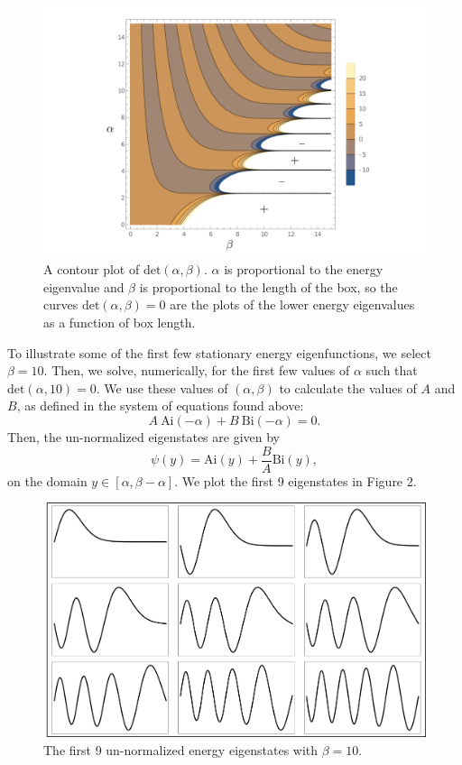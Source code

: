 \documentclass[12pt]{article}
\begin{document}
\begin{figure}[ht]
	\centering
	\includegraphics[width=\textwidth]{figures/plot1.png}
	\caption{A contour plot of $\text{det}(\alpha,\beta)$.  $\alpha$ is proportional to the energy eigenvalue and $\beta$ is proportional to the length of the box, so the curves $\text{det}(\alpha,\beta) = 0$ are the plots of the lower energy eigenvalues as a function of box length.}
\end{figure}

To illustrate some of the first few stationary energy eigenfunctions, we select $\beta = 10$.  Then, we solve, numerically, for the first few values of $\alpha$ such that $\text{det}(\alpha, 10) = 0.$  We use these values of $(\alpha,\beta)$ to calculate the values of $A$ and $B$, as defined in the system of equations found above:
\[
	A \ \text{Ai}(-\alpha) + B \ \text{Bi}(-\alpha) = 0.
\]
Then, the un-normalized eigenstates are given by
\[
	\psi(y) = \text{Ai}(y) + \frac{B}{A}\text{Bi}(y),
\] 
on the domain $y \in [\alpha, \beta - \alpha]$.  We plot the first 9 eigenstates in Figure 2.

\begin{figure}[ht]
	\centering
	\includegraphics[width=\textwidth]{figures/plot2.png}
	\caption{The first 9 un-normalized energy eigenstates with $\beta = 10$.}
\end{figure}
\end{document}
